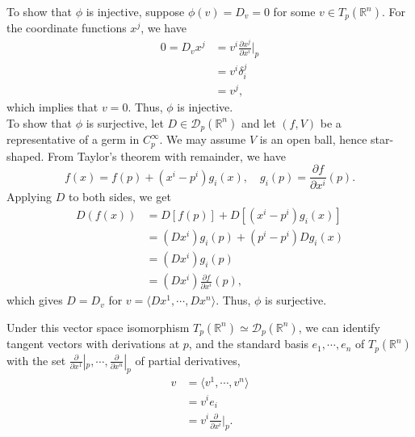 \documentclass[en, oneside]{vivi}
\begin{document}
\begin{pf}
    To show that $\phi$ is injective, suppose $\phi(v) = D_v = 0$ for some $v \in T_p(\mathbb{R}^n)$. For the coordinate functions $x^j$, we have
    \begin{align*}
        0 = D_v x^j &= v^i \frac{\partial x^j}{\partial x^i} \bigg|_{p}\\
        &= v^i \delta^j_i\\
        &= v^j,
    \end{align*}
    which implies that $v = 0$. Thus, $\phi$ is injective.\\
    To show that $\phi$ is surjective, let $D \in \mathcal{D}_p(\mathbb{R}^n)$ and let $(f, V)$ be a representative of a germ in $C_p^\infty$.
    We may assume $V$ is an open ball, hence star-shaped. From Taylor's theorem with remainder, we have
    \begin{equation*}
        f(x) = f(p) + (x^i - p^i) g_i(x), \quad g_i(p) = \frac{\partial f}{\partial x^i}(p).
    \end{equation*}
    Applying $D$ to both sides, we get
    \begin{align*}
        D(f(x)) &= D[f(p)] + D[(x^i - p^i) g_i(x)]\\
        &= (Dx^i)g_i(p) + (p^i - p^i) Dg_i(x)\\
        &= (Dx^i)g_i(p)\\
        &= (Dx^i) \frac{\partial f}{\partial x^i}(p),
    \end{align*}
    which gives $D = D_v$ for $v = \langle Dx^1, \cdots, D x^n \rangle$. Thus, $\phi$ is surjective.
\end{pf}
Under this vector space isomorphism $T_p(\mathbb{R}^n) \simeq \mathcal{D}_p(\mathbb{R}^n)$, we can identify tangent vectors with derivations at $p$,
and the standard basis $e_1, \cdots, e_n$ of $T_p(\mathbb{R}^n)$ with the set $\frac{\partial}{\partial x^1}|_p, \cdots, \frac{\partial}{\partial x^n}|_p$ of partial derivatives,
\begin{align*}
    v &= \langle v^1, \cdots, v^n \rangle\\
    &= v^i e_i\\
    &= v^i \frac{\partial}{\partial x^i} \bigg|_{p}.
\end{align*}
\end{document}
